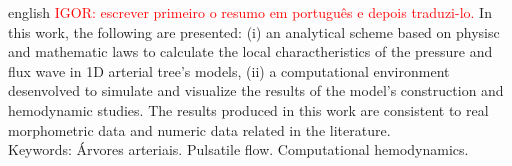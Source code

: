 \documentclass[
        english,			
        brazil			        %
        ,<...>]{abntbibufjf}
\begin{document}
 
\begin{resumo}[ABSTRACT]
 \begin{otherlanguage*}{english}
\textcolor{red}{IGOR: escrever primeiro o resumo em português e depois traduzi-lo.}
In this work, the following are presented: (i) an analytical scheme based on physisc and mathematic laws to calculate the local charactheristics of the pressure and flux wave in 1D arterial tree's models, (ii) a computational environment desenvolved to simulate and visualize the results of the model's construction and hemodynamic studies. The results produced in this work are consistent to real morphometric data and numeric data related in the literature. \\[18pt]
Keywords: Árvores arteriais. Pulsatile flow. Computational hemodynamics. %
 \end{otherlanguage*}
\end{resumo}




\ilustvaria   %
\listilustvaria  %


\cleardoublepage
\listoftables*    %
\cleardoublepage


\end{document}
